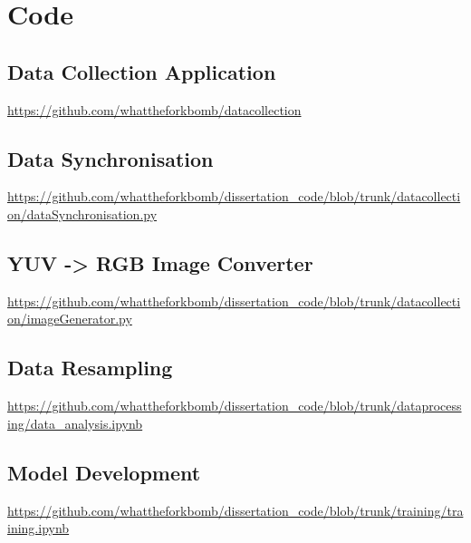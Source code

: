 \newpage
\section{Code}
\subsection{Data Collection Application}
\url{https://github.com/whattheforkbomb/datacollection}

\subsection{Data Synchronisation}
\url{https://github.com/whattheforkbomb/dissertation_code/blob/trunk/datacollection/dataSynchronisation.py}

\subsection{YUV -> RGB Image Converter}
\url{https://github.com/whattheforkbomb/dissertation_code/blob/trunk/datacollection/imageGenerator.py}

\subsection{Data Resampling}
\url{https://github.com/whattheforkbomb/dissertation_code/blob/trunk/dataprocessing/data_analysis.ipynb}

\subsection{Model Development}
\url{https://github.com/whattheforkbomb/dissertation_code/blob/trunk/training/training.ipynb}

